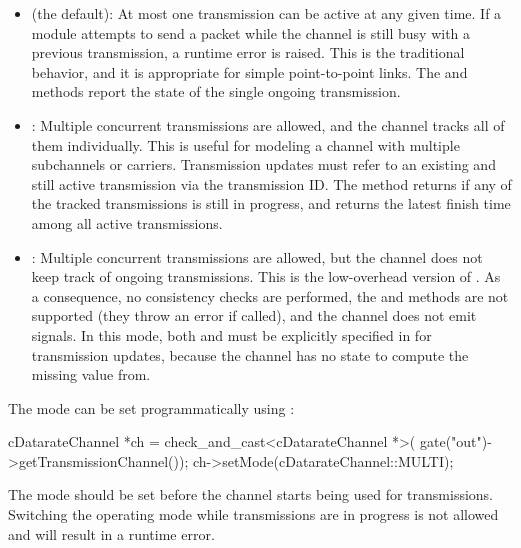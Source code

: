 \begin{itemize}
  \item {} (the default): At most one transmission can be active at
    any given time. If a module attempts to send a packet while the channel is
    still busy with a previous transmission, a runtime error is raised. This
    is the traditional behavior, and it is appropriate for simple point-to-point
    links. The  and  methods
    report the state of the single ongoing transmission.

  \item {}: Multiple concurrent transmissions are allowed, and the
    channel tracks all of them individually. This is useful for modeling a channel
    with multiple subchannels or carriers. Transmission updates must refer to an
    existing and still active transmission via the transmission ID.
    The  method returns  if any of the tracked
    transmissions is still in progress, and 
    returns the latest finish time among all active transmissions.

  \item {}: Multiple concurrent transmissions are allowed, but
    the channel does not keep track of ongoing transmissions. This is the
    low-overhead version of . As a consequence, no consistency
    checks are performed, the  and
     methods are not supported (they throw
    an error if called), and the channel does not emit 
    signals. In this mode, both  and 
    must be explicitly specified in  for transmission updates,
    because the channel has no state to compute the missing value from.
\end{itemize}

The mode can be set programmatically using :

\begin{cpp}
cDatarateChannel *ch = check_and_cast<cDatarateChannel *>(
    gate("out")->getTransmissionChannel());
ch->setMode(cDatarateChannel::MULTI);
\end{cpp}

\begin{note}
  The mode should be set before the channel starts being used for transmissions.
  Switching the operating mode while transmissions are in progress is not
  allowed and will result in a runtime error.
\end{note}


